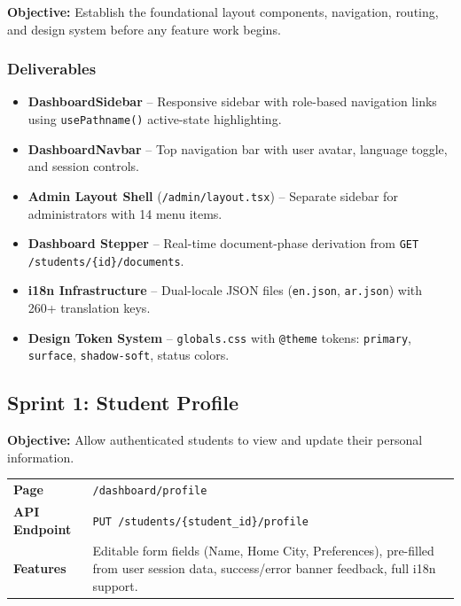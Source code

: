 \documentclass[12pt,a4paper]{article}
\begin{document}
\textbf{Objective:} Establish the foundational layout components, navigation, routing, and design system before any feature work begins.

\subsubsection{Deliverables}

\begin{itemize}[leftmargin=2em]
    \item \textbf{DashboardSidebar} -- Responsive sidebar with role-based navigation links using \texttt{usePathname()} active-state highlighting.
    \item \textbf{DashboardNavbar} -- Top navigation bar with user avatar, language toggle, and session controls.
    \item \textbf{Admin Layout Shell} (\texttt{/admin/layout.tsx}) -- Separate sidebar for administrators with 14 menu items.
    \item \textbf{Dashboard Stepper} -- Real-time document-phase derivation from \texttt{GET /students/\{id\}/documents}.
    \item \textbf{i18n Infrastructure} -- Dual-locale JSON files (\texttt{en.json}, \texttt{ar.json}) with 260+ translation keys.
    \item \textbf{Design Token System} -- \texttt{globals.css} with \texttt{@theme} tokens: \texttt{primary}, \texttt{surface}, \texttt{shadow-soft}, status colors.
\end{itemize}


\subsection{Sprint 1: Student Profile}

\textbf{Objective:} Allow authenticated students to view and update their personal information.

\begin{longtable}{p{3.5cm}p{9.5cm}}
\toprule
\textbf{Page} & \texttt{/dashboard/profile} \\
\textbf{API Endpoint} & \texttt{PUT /students/\{student\_id\}/profile} \\
\textbf{Features} & Editable form fields (Name, Home City, Preferences), pre-filled from user session data, success/error banner feedback, full i18n support. \\
\bottomrule
\end{longtable}
\end{document}
